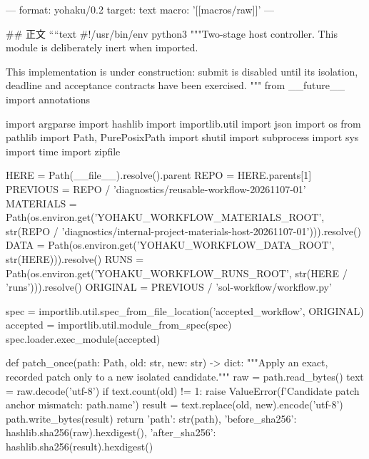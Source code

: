 ---
format: yohaku/0.2
target: text
macro: '[[macros/raw]]'
---

## 正文
````text
#!/usr/bin/env python3
"""Two-stage host controller. This module is deliberately inert when imported.

This implementation is under construction: submit is disabled until its
isolation, deadline and acceptance contracts have been exercised.
"""
from __future__ import annotations

import argparse
import hashlib
import importlib.util
import json
import os
from pathlib import Path, PurePosixPath
import shutil
import subprocess
import sys
import time
import zipfile

HERE = Path(__file__).resolve().parent
REPO = HERE.parents[1]
PREVIOUS = REPO / 'diagnostics/reusable-workflow-20261107-01'
MATERIALS = Path(os.environ.get('YOHAKU_WORKFLOW_MATERIALS_ROOT', str(REPO / 'diagnostics/internal-project-materials-host-20261107-01'))).resolve()
DATA = Path(os.environ.get('YOHAKU_WORKFLOW_DATA_ROOT', str(HERE))).resolve()
RUNS = Path(os.environ.get('YOHAKU_WORKFLOW_RUNS_ROOT', str(HERE / 'runs'))).resolve()
ORIGINAL = PREVIOUS / 'sol-workflow/workflow.py'

spec = importlib.util.spec_from_file_location('accepted_workflow', ORIGINAL)
accepted = importlib.util.module_from_spec(spec)
spec.loader.exec_module(accepted)


def patch_once(path: Path, old: str, new: str) -> dict:
    """Apply an exact, recorded patch only to a new isolated candidate."""
    raw = path.read_bytes()
    text = raw.decode('utf-8')
    if text.count(old) != 1:
        raise ValueError(f'Candidate patch anchor mismatch: {path.name}')
    result = text.replace(old, new).encode('utf-8')
    path.write_bytes(result)
    return {'path': str(path), 'before_sha256': hashlib.sha256(raw).hexdigest(),
            'after_sha256': hashlib.sha256(result).hexdigest()}


